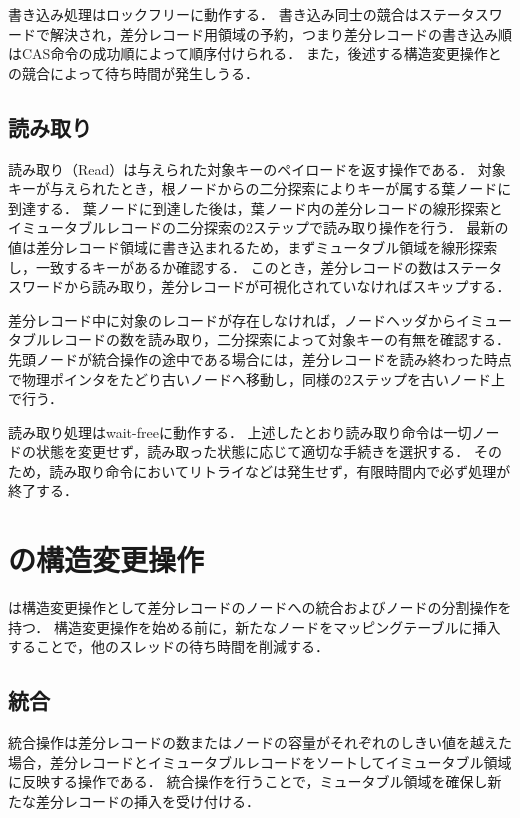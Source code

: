 書き込み処理はロックフリーに動作する．
書き込み同士の競合はステータスワードで解決され，差分レコード用領域の予約，つまり差分レコードの書き込み順はCAS命令の成功順によって順序付けられる．
また，後述する構造変更操作との競合によって待ち時間が発生しうる．

\subsection{読み取り}

読み取り（Read）は与えられた対象キーのペイロードを返す操作である．
対象キーが与えられたとき，根ノードからの二分探索によりキーが属する葉ノードに到達する．
葉ノードに到達した後は，葉ノード内の差分レコードの線形探索とイミュータブルレコードの二分探索の2ステップで読み取り操作を行う．
最新の値は差分レコード領域に書き込まれるため，まずミュータブル領域を線形探索し，一致するキーがあるか確認する．
このとき，差分レコードの数はステータスワードから読み取り，差分レコードが可視化されていなければスキップする．

差分レコード中に対象のレコードが存在しなければ，ノードヘッダからイミュータブルレコードの数を読み取り，二分探索によって対象キーの有無を確認する．
先頭ノードが統合操作の途中である場合には，差分レコードを読み終わった時点で物理ポインタをたどり古いノードへ移動し，同様の2ステップを古いノード上で行う．

読み取り処理はwait-freeに動作する．
上述したとおり読み取り命令は一切ノードの状態を変更せず，読み取った状態に応じて適切な手続きを選択する．
そのため，読み取り命令においてリトライなどは発生せず，有限時間内で必ず処理が終了する．

\section{\Bctree{}の構造変更操作}
\label{sec:smo}

\Bctree{}は構造変更操作として差分レコードのノードへの統合およびノードの分割操作を持つ．
構造変更操作を始める前に，新たなノードをマッピングテーブルに挿入することで，他のスレッドの待ち時間を削減する．

\subsection{統合}

統合操作は差分レコードの数またはノードの容量がそれぞれのしきい値を越えた場合，差分レコードとイミュータブルレコードをソートしてイミュータブル領域に反映する操作である．
統合操作を行うことで，ミュータブル領域を確保し新たな差分レコードの挿入を受け付ける．

